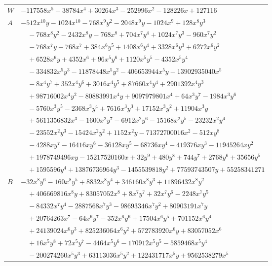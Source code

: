 \documentclass[11pt]{article}
\begin{document}
\begin{longtable}{@{}ll@{}}
$W$ & $-117558x^{5}+38784x^{4}+30264x^{3}-252996x^{2}-128226x+127116$\\
$A$ & $-512x^{10}y-1024x^{10}-768x^{9}y^{2}-2048x^{9}y-1024x^{9}+128x^{8}y^{3}$\\
 & $\quad -768x^{8}y^{2}-2432x^{8}y-768x^{8}+704x^{7}y^{4}+1024x^{7}y^{3}-960x^{7}y^{2}$\\
 & $\quad -768x^{7}y-768x^{7}+384x^{6}y^{5}+1408x^{6}y^{4}+3328x^{6}y^{3}+6272x^{6}y^{2}$\\
 & $\quad +6528x^{6}y+4352x^{6}+96x^{5}y^{6}+1120x^{5}y^{5}-4352x^{5}y^{4}$\\
 & $\quad -334832x^{5}y^{3}-11878448x^{5}y^{2}-406653944x^{5}y-13902935040x^{5}$\\
 & $\quad -8x^{4}y^{7}+352x^{4}y^{6}+3016x^{4}y^{5}+87660x^{4}y^{4}+2901392x^{4}y^{3}$\\
 & $\quad +98716002x^{4}y^{2}-80883991x^{4}y+9097979801x^{4}+64x^{3}y^{7}-1984x^{3}y^{6}$\\
 & $\quad -5760x^{3}y^{5}-2368x^{3}y^{4}+7616x^{3}y^{3}+17152x^{3}y^{2}+11904x^{3}y$\\
 & $\quad +5611356832x^{3}-1600x^{2}y^{7}-6912x^{2}y^{6}-15168x^{2}y^{5}-23232x^{2}y^{4}$\\
 & $\quad -23552x^{2}y^{3}-15424x^{2}y^{2}+1152x^{2}y-71372700016x^{2}-512xy^{8}$\\
 & $\quad -4288xy^{7}-16416xy^{6}-36128xy^{5}-68736xy^{4}-419376xy^{3}-11945264xy^{2}$\\
 & $\quad +1978749496xy-15217520160x+32y^{9}+480y^{8}+744y^{7}+2768y^{6}+35656y^{5}$\\
 & $\quad +1595596y^{4}+13876736964y^{3}-1455539818y^{2}+77593743507y+55258341271$\\
$B$ & $-32x^{8}y^{6}-160x^{8}y^{5}+8832x^{8}y^{4}+346160x^{8}y^{3}+11896432x^{8}y^{2}$\\
 & $\quad +406669816x^{8}y+83057052x^{8}+8x^{7}y^{7}+32x^{7}y^{6}-2248x^{7}y^{5}$\\
 & $\quad -84332x^{7}y^{4}-2887568x^{7}y^{3}-98693346x^{7}y^{2}+80903191x^{7}y$\\
 & $\quad +20764263x^{7}-64x^{6}y^{7}-352x^{6}y^{6}+17504x^{6}y^{5}+701152x^{6}y^{4}$\\
 & $\quad +24139024x^{6}y^{3}+825236064x^{6}y^{2}+572783920x^{6}y+83057052x^{6}$\\
 & $\quad +16x^{5}y^{8}+72x^{5}y^{7}-4464x^{5}y^{6}-170912x^{5}y^{5}-5859468x^{5}y^{4}$\\
 & $\quad -200274260x^{5}y^{3}+63113036x^{5}y^{2}+122431717x^{5}y+9562538279x^{5}$\\

\end{longtable}
\end{document}
